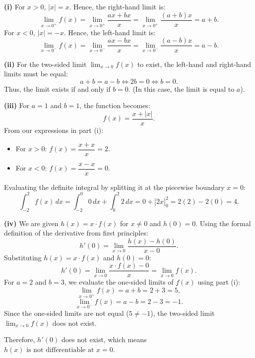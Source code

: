 \begin{solution}
\textbf{(i)} For $x > 0$, $|x| = x$. Hence, the right-hand limit is:
\[
\lim_{x \to 0^+} f(x) = \lim_{x \to 0^+} \frac{ax + bx}{x} = \lim_{x \to 0^+} \frac{(a+b)x}{x} = \boxed{a + b.}
\]
For $x < 0$, $|x| = -x$. Hence, the left-hand limit is:
\[
\lim_{x \to 0^-} f(x) = \lim_{x \to 0^-} \frac{ax - bx}{x} = \lim_{x \to 0^-} \frac{(a-b)x}{x} = \boxed{a - b.}
\]

\textbf{(ii)} For the two-sided limit $\lim_{x \to 0} f(x)$ to exist, the left-hand and right-hand limits must be equal:
\[
a + b = a - b \iff 2b = 0 \iff b = 0.
\]
Thus, the limit exists if and only if $\boxed{b = 0}$. (In this case, the limit is equal to $a$).

\textbf{(iii)} For $a = 1$ and $b = 1$, the function becomes:
\[
f(x) = \frac{x + |x|}{x}.
\]
From our expressions in part (i):
\begin{itemize}[leftmargin=*]
    \item For $x > 0$: $f(x) = \dfrac{x + x}{x} = 2$.
    \item For $x < 0$: $f(x) = \dfrac{x - x}{x} = 0$.
\end{itemize}
Evaluating the definite integral by splitting it at the piecewise boundary $x = 0$:
\[
\int_{-2}^{2} f(x) \, dx = \int_{-2}^{0} 0 \, dx + \int_{0}^{2} 2 \, dx = 0 + \Big[ 2x \Big]_0^2 = 2(2) - 2(0) = \boxed{4.}
\]

\textbf{(iv)} We are given $h(x) = x \cdot f(x)$ for $x \neq 0$ and $h(0) = 0$. Using the formal definition of the derivative from first principles:
\[
h'(0) = \lim_{x \to 0} \frac{h(x) - h(0)}{x - 0}.
\]
Substituting $h(x) = x \cdot f(x)$ and $h(0) = 0$:
\[
h'(0) = \lim_{x \to 0} \frac{x \cdot f(x) - 0}{x} = \lim_{x \to 0} f(x).
\]
For $a = 2$ and $b = 3$, we evaluate the one-sided limits of $f(x)$ using part (i):
\[
\lim_{x \to 0^+} f(x) = a + b = 2 + 3 = 5,
\]
\[
\lim_{x \to 0^-} f(x) = a - b = 2 - 3 = -1.
\]
Since the one-sided limits are not equal ($5 \neq -1$), the two-sided limit $\lim_{x \to 0} f(x)$ does not exist.

Therefore, $h'(0)$ does not exist, which means $\boxed{h(x)\text{ is not differentiable at } x = 0.}$
\end{solution}

